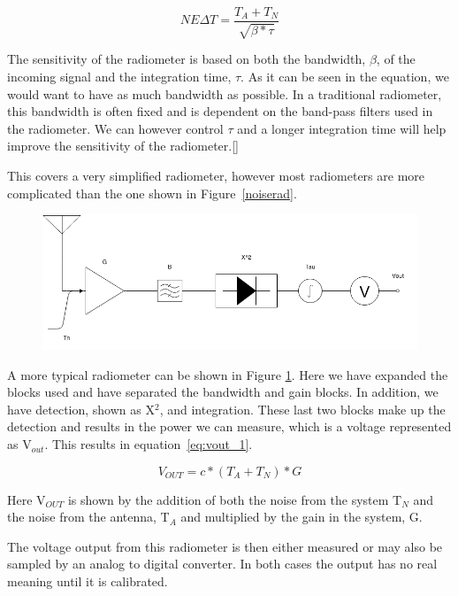 \begin{equation} \label{NEAT_EQ}
NE\Delta T=\frac{T_{A}+T_{N}}{\sqrt{\beta * \tau}}
\end{equation}

The sensitivity of the radiometer is based on both the bandwidth, $\beta$, of the incoming signal and the integration time, $\tau$.  As it can be seen in the equation, we would want to have as much bandwidth as possible.  In a traditional radiometer, this bandwidth is often fixed and is dependent on the band-pass filters used in the radiometer.  We can however control $\tau$ and a longer integration time will help improve the sensitivity of the radiometer.[\cite{ulaby}]

This covers a very simplified radiometer, however most radiometers are more complicated than the one shown in Figure~\ref{noiserad}.

{\begin{figure}[h!tb] 
\centering
\includegraphics[width=\textwidth]{Images/Radiometer.png}
\label{trad_radiometer}
\end{figure}
}

A more typical radiometer can be shown in Figure \ref{trad_radiometer}.  Here we have expanded the blocks used and have separated the bandwidth and gain blocks.  In addition, we have detection, shown as X$^2$, and integration.  These last two blocks make up the detection and results in the power we can measure, which is a voltage represented as V$_{out}$.  This results in equation~\ref{eq:vout_1}.

\begin{equation} \label{eq:vout_1}
V_{OUT}=c*(T_A+T_N)*G
\end{equation}

Here V$_{OUT}$ is shown by the addition of both the noise from the system T$_N$ and the noise from the antenna, T$_A$ and multiplied by the gain in the system, G.

The voltage output from this radiometer is then either measured or may also be sampled by an analog to digital converter.  In both cases the output has no real meaning until it is calibrated.

